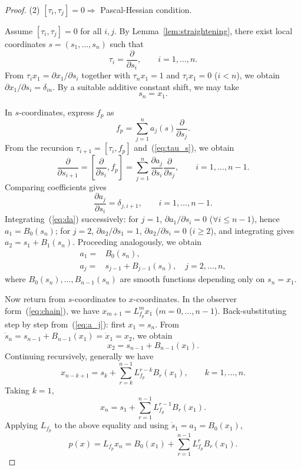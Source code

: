 \documentclass[11pt]{article}
\begin{document}
\begin{proof}
	\medskip
	\noindent (2) $[\tau_i,\tau_j]=0\Rightarrow$ Pascal-Hessian condition.

	Assume $[\tau_i,\tau_j]=0$ for all $i,j$. By Lemma~\ref{lem:straightening}, there exist local coordinates $s=(s_1,\ldots,s_n)$ such that
	\begin{equation}\label{eq:tau_s}
		\tau_i=\frac{\partial}{\partial s_i},\qquad i=1,\ldots,n.
	\end{equation}
	From $\tau_i x_1=\partial x_1/\partial s_i$ together with $\tau_n x_1=1$ and $\tau_i x_1=0$ ($i<n$), we obtain $\partial x_1/\partial s_i=\delta_{in}$. By a suitable additive constant shift, we may take
	\begin{equation}\label{eq:sn_x1}
		s_n=x_1.
	\end{equation}

	In $s$-coordinates, express $f_p$ as
	\[
	f_p=\sum_{j=1}^n a_j(s)\frac{\partial}{\partial s_j}.
	\]
	From the recursion $\tau_{i+1}=[\tau_i,f_p]$ and~(\ref{eq:tau_s}), we obtain
	\[
	\frac{\partial}{\partial s_{i+1}}=\left[\frac{\partial}{\partial s_i},f_p\right]=\sum_{j=1}^n\frac{\partial a_j}{\partial s_i}\frac{\partial}{\partial s_j},\qquad i=1,\ldots,n-1.
	\]
	Comparing coefficients gives
	\begin{equation}\label{eq:da}
		\frac{\partial a_j}{\partial s_i}=\delta_{j,i+1},\qquad i=1,\ldots,n-1.
	\end{equation}
	Integrating~(\ref{eq:da}) successively: for $j=1$, $\partial a_1/\partial s_i=0$ ($\forall i\leq n-1$), hence $a_1=B_0(s_n)$; for $j=2$, $\partial a_2/\partial s_1=1$, $\partial a_2/\partial s_i=0$ ($i\geq2$), and integrating gives $a_2=s_1+B_1(s_n)$. Proceeding analogously, we obtain
	\begin{align}
		a_1=&B_0(s_n),\\
		a_j=&s_{j-1}+B_{j-1}(s_n),\quad j=2,\ldots,n,\label{eq:a_j}
	\end{align}
	where $B_0(s_n),\ldots,B_{n-1}(s_n)$ are smooth functions depending only on $s_n=x_1$.

	Now return from $s$-coordinates to $x$-coordinates. In the observer form~(\ref{eq:chain}), we have $x_{m+1}=L_{f_p}^m x_1$ ($m=0,\ldots,n-1$). Back-substituting step by step from~(\ref{eq:a_j}): first $x_1=s_n$. From $\dot{s}_n=s_{n-1}+B_{n-1}(x_1)=\dot{x}_1=x_2$, we obtain
	\[
	x_2=s_{n-1}+B_{n-1}(x_1).
	\]
	Continuing recursively, generally we have
	\begin{equation}\label{eq:x2s_inv}
		x_{n-k+1}=s_k+\sum_{r=k}^{n-1}L_{f_p}^{r-k}B_r(x_1),\qquad k=1,\ldots,n.
	\end{equation}
	Taking $k=1$,
	\[
	x_n=s_1+\sum_{r=1}^{n-1}L_{f_p}^{r-1}B_r(x_1).
	\]
	Applying $L_{f_p}$ to the above equality and using $\dot{s}_1=a_1=B_0(x_1)$,
	\begin{equation}\label{eq:p_Lf}
		p(x)=L_{f_p}x_n=B_0(x_1)+\sum_{r=1}^{n-1}L_{f_p}^r B_r(x_1).
	\end{equation}


\end{proof}
\end{document}
